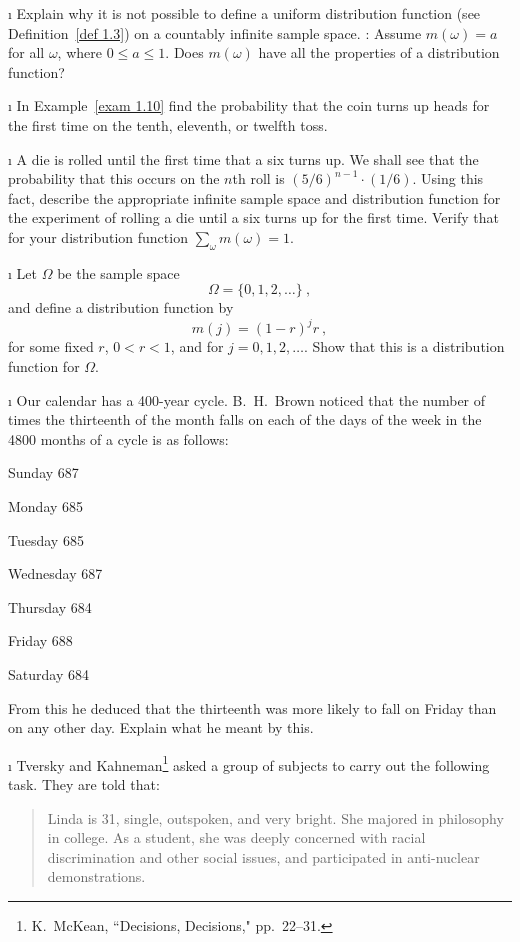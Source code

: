 \begin{LJSItem}
\i\label{exer 1.2.19} Explain why it is not possible to define a
uniform distribution function (see Definition~\ref{def 1.3}) 
on a countably infinite sample space.  : Assume $m(\omega) = a$
for all
$\omega$, where $0 \leq a \leq 1$.  Does $m(\omega)$ have all the properties
of
a distribution function?

\i\label{exer 1.2.20} In Example~\ref{exam 1.10} find the probability that
the
coin turns up heads for the first time on the tenth, eleventh, or twelfth
toss.

\i\label{exer 1.2.21} A die is rolled until the first time that a six
turns up.  We shall
see that the probability that this occurs on the $n$th roll is
$(5/6)^{n-1}\cdot(1/6)$.  Using this fact, describe the appropriate infinite
sample space and distribution function for the experiment of rolling a die until a six
turns
up for the first time.  Verify that for your distribution function $\sum_{\omega} m(\omega)
=
1$.

\i\label{exer 1.2.22} 
Let $\Omega$ be the sample space
$$
\Omega = \{0,1,2,\dots\}\ ,
$$
and define a distribution function by
$$
m(j) = (1 - r)^j r\ ,
$$
for some fixed $r$, $0 < r < 1$, and for $j = 0, 1, 2, \ldots$.
Show that this is a distribution function for $\Omega$.

\i\label{exer 1.2.23} Our calendar has a 400-year cycle.  
B.~H.~Brown
noticed that the
number of times the thirteenth of the month falls on each of the days of the
week in
the 4800 months of a cycle is as follows:

\par Sunday 687
\par Monday 685
\par Tuesday 685
\par Wednesday 687
\par Thursday 684
\par Friday 688
\par Saturday 684

\noindent From this he deduced that the thirteenth was more likely to fall on
Friday than on any other day.  Explain what he meant by this.

\i\label{exer 1.2.24} Tversky and Kahneman\footnote{K.~McKean, ``Decisions,
Decisions," pp.~22--31.} asked a group of subjects to carry out the
following
task.  They are told that:

\begin{quote}
Linda is 31, single, outspoken, and very bright.  She majored in philosophy
in
college.  As a student, she was deeply concerned with racial discrimination
and
other social issues, and participated in anti-nuclear demonstrations.
\end{quote}


\end{LJSItem}
